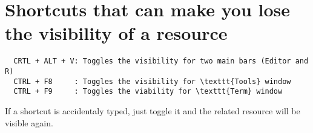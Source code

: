 
\section{Shortcuts that can make you lose the visibility of a resource}

\begin{verbatim}
  CRTL + ALT + V: Toggles the visibility for two main bars (Editor and R)
  CTRL + F8     : Toggles the visibility for \texttt{Tools} window
  CTRL + F9     : Toggles the viability for \texttt{Term} window
\end{verbatim}

If a shortcut is accidentaly typed, just toggle it and the related resource will be visible again.
